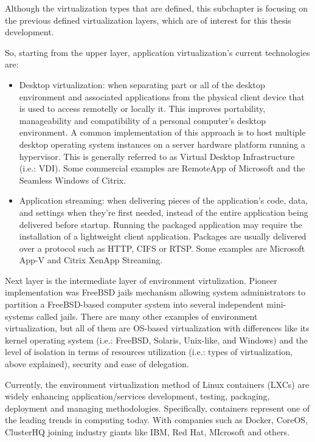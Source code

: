 Although the virtualization types that are defined, this subchapter is focusing on the previous defined virtualization layers, which are of interest for this thesis development.

So, starting from the upper layer, application virtualization's current technologies are:

\begin{itemize}
\item Desktop virtualization: when separating part or all of the desktop environment and associated applications from the physical client device that is used to access remotelly or locally it. This improves portability, manageability and compatibility of a personal computer's desktop environment. A common implementation of this approach is to host multiple desktop operating system instances on a server hardware platform running a hypervisor. This is generally referred to as Virtual Desktop Infrastructure (i.e.: VDI). Some commercial examples are RemoteApp of Microsoft and the Seamless Windows of Citrix. 
\item Application streaming: when delivering pieces of the application's code, data, and settings when they're first needed, instead of the entire application being delivered before startup. Running the packaged application may require the installation of a lightweight client application. Packages are usually delivered over a protocol such as HTTP, CIFS or RTSP. Some examples are Microsoft App-V and Citrix XenApp Streaming.
\end{itemize}

Next layer is the intermediate layer of environment virtulization. Pioneer implementation was FreeBSD jails mechanism allowing system administrators to partition a FreeBSD-based computer system into several independent mini-systems called jails. There are many other examples of environment virtualization, but all of them are OS-based virtualization with differences like its kernel operating system (i.e.: FreeBSD, Solaris, Unix-like, and Windows) and the level of isolation in terms of resources utilization (i.e.: types of virtualization, above explained), security and ease of delegation. 

Currently, the environment virtualization method of Linux containers (LXCs) are widely enhancing application/services development, testing, packaging, deployment and managing methodologies. Specifically, containers represent one of the leading trends in computing today. With companies such as Docker, CoreOS, ClusterHQ joining industry giants like IBM, Red Hat, MIcrosoft and others.

